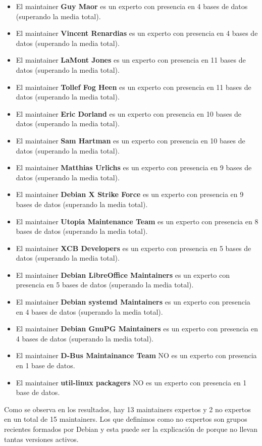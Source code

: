 \documentclass[a4paper, 12pt]{book}
\begin{document}
	\begin{itemize}
		\item El maintainer \textbf{Guy Maor} es un experto con presencia en 4 bases de datos (superando la media total).
		\item El maintainer \textbf{Vincent Renardias} es un experto con presencia en 4 bases de datos (superando la media total).
		\item El maintainer \textbf{LaMont Jones} es un experto con presencia en 11 bases de datos (superando la media total).
		\item El maintainer \textbf{Tollef Fog Heen} es un experto con presencia en 11 bases de datos (superando la media total).
		\item El maintainer \textbf{Eric Dorland} es un experto con presencia en 10 bases de datos (superando la media total).
		\item El maintainer \textbf{Sam Hartman} es un experto con presencia en 10 bases de datos (superando la media total).
		\item El maintainer \textbf{Matthias Urlichs} es un experto con presencia en 9 bases de datos (superando la media total).
		\item El maintainer \textbf{Debian X Strike Force} es un experto con presencia en 9 bases de datos (superando la media total).
		\item El maintainer \textbf{Utopia Maintenance Team} es un experto con presencia en 8 bases de datos (superando la media total).
		\item El maintainer \textbf{XCB Developers} es un experto con presencia en 5 bases de datos (superando la media total).
		\item El maintainer \textbf{Debian LibreOffice Maintainers} es un experto con presencia en 5 bases de datos (superando la media total).
		\item El maintainer \textbf{Debian systemd Maintainers} es un experto con presencia en 4 bases de datos (superando la media total).
		\item El maintainer \textbf{Debian GnuPG Maintainers} es un experto con presencia en 4 bases de datos (superando la media total).
		\item El maintainer \textbf{D-Bus Maintainance Team} NO es un experto con presencia en 1 base de datos.
		\item El maintainer \textbf{util-linux packagers} NO es un experto con presencia en 1 base de datos.
	\end{itemize}

Como se observa en los resultados, hay 13 maintainers expertos y 2 no expertos en un total de 15 maintainers. Los que definimos como no expertos son grupos recientes formados por Debian y esta puede ser la explicación de porque no llevan tantas versiones activos.
\end{document}
